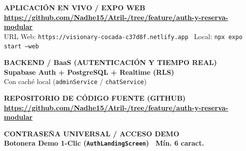 \documentclass[10pt,letterpaper]{article}
\begin{document}
\noindent
\begin{minipage}[t]{0.49\textwidth}
  \begin{tcolorbox}[colback=white,colframe=atrilBorder,boxrule=0.7pt,arc=3pt,left=7pt,right=7pt,top=4pt,bottom=4pt,height=1.30cm,valign=center]
    {\scriptsize\bfseries\color{atrilTextMuted} APLICACIÓN EN VIVO / EXPO WEB}\\[1pt]
    {\scriptsize\bfseries\color{atrilPrimary}\url{https://github.com/Nadhe15/Atril-/tree/feature/auth-y-reserva-modular}}\\[1pt]
    {\scriptsize\color{atrilTextMuted} URL Web: \texttt{https://visionary-cocada-c37d8f.netlify.app} \textbar\ Local: \texttt{npx expo start --web}}
  \end{tcolorbox}
\end{minipage}\hfill
\begin{minipage}[t]{0.49\textwidth}
  \begin{tcolorbox}[colback=white,colframe=atrilBorder,boxrule=0.7pt,arc=3pt,left=7pt,right=7pt,top=4pt,bottom=4pt,height=1.30cm,valign=center]
    {\scriptsize\bfseries\color{atrilTextMuted} BACKEND / BaaS (AUTENTICACIÓN Y TIEMPO REAL)}\\[1pt]
    {\footnotesize\bfseries\color{atrilPrimary} Supabase Auth + PostgreSQL + Realtime (RLS)}\\[1pt]
    {\scriptsize\color{atrilTextMuted} Con caché local (\texttt{adminService} / \texttt{chatService})}
  \end{tcolorbox}
\end{minipage}

\vspace{0.08cm}

\noindent
\begin{minipage}[t]{0.49\textwidth}
  \begin{tcolorbox}[colback=white,colframe=atrilBorder,boxrule=0.7pt,arc=3pt,left=7pt,right=7pt,top=4pt,bottom=4pt,height=1.12cm,valign=center]
    {\scriptsize\bfseries\color{atrilTextMuted} REPOSITORIO DE CÓDIGO FUENTE (GITHUB)}\\[1pt]
    {\scriptsize\bfseries\color{atrilPrimary}\url{https://github.com/Nadhe15/Atril-/tree/feature/auth-y-reserva-modular}}
  \end{tcolorbox}
\end{minipage}\hfill
\begin{minipage}[t]{0.49\textwidth}
  \begin{tcolorbox}[colback=white,colframe=atrilBorder,boxrule=0.7pt,arc=3pt,left=7pt,right=7pt,top=4pt,bottom=4pt,height=1.12cm,valign=center]
    {\scriptsize\bfseries\color{atrilTextMuted} CONTRASEÑA UNIVERSAL / ACCESO DEMO}\\[1pt]
    {\footnotesize\bfseries\color{atrilNavy} Botonera Demo 1-Clic (\texttt{AuthLandingScreen}) \textbar\ Mín. 6 caract.}
  \end{tcolorbox}
\end{minipage}
\end{document}
